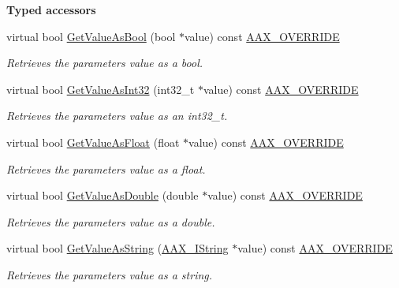 \begin{Indent}{\bf Typed accessors}\par
\begin{DoxyCompactItemize}
\item 
virtual bool \hyperlink{a00033_a70d1b697d4a449b57de917baa0b50e95}{Get\+Value\+As\+Bool} (bool $\ast$value) const \hyperlink{a00149_ac2f24a5172689ae684344abdcce55463}{A\+A\+X\+\_\+\+O\+V\+E\+R\+R\+I\+D\+E}
\begin{DoxyCompactList}\small\item\em Retrieves the parameter\textquotesingle{}s value as a bool. \end{DoxyCompactList}\item 
virtual bool \hyperlink{a00033_af9018dbc8c282fec893a6aa240c3a631}{Get\+Value\+As\+Int32} (int32\+\_\+t $\ast$value) const \hyperlink{a00149_ac2f24a5172689ae684344abdcce55463}{A\+A\+X\+\_\+\+O\+V\+E\+R\+R\+I\+D\+E}
\begin{DoxyCompactList}\small\item\em Retrieves the parameter\textquotesingle{}s value as an int32\+\_\+t. \end{DoxyCompactList}\item 
virtual bool \hyperlink{a00033_a468c96e334e4155490fca7369f7ad323}{Get\+Value\+As\+Float} (float $\ast$value) const \hyperlink{a00149_ac2f24a5172689ae684344abdcce55463}{A\+A\+X\+\_\+\+O\+V\+E\+R\+R\+I\+D\+E}
\begin{DoxyCompactList}\small\item\em Retrieves the parameter\textquotesingle{}s value as a float. \end{DoxyCompactList}\item 
virtual bool \hyperlink{a00033_ae9687028a6c6a5e93223fde4ca9c06ea}{Get\+Value\+As\+Double} (double $\ast$value) const \hyperlink{a00149_ac2f24a5172689ae684344abdcce55463}{A\+A\+X\+\_\+\+O\+V\+E\+R\+R\+I\+D\+E}
\begin{DoxyCompactList}\small\item\em Retrieves the parameter\textquotesingle{}s value as a double. \end{DoxyCompactList}\item 
virtual bool \hyperlink{a00033_a7c5e951eb4c32b2993048acb414adc52}{Get\+Value\+As\+String} (\hyperlink{a00113}{A\+A\+X\+\_\+\+I\+String} $\ast$value) const \hyperlink{a00149_ac2f24a5172689ae684344abdcce55463}{A\+A\+X\+\_\+\+O\+V\+E\+R\+R\+I\+D\+E}
\begin{DoxyCompactList}\small\item\em Retrieves the parameter\textquotesingle{}s value as a string. \end{DoxyCompactList}\item 

\end{DoxyCompactItemize}
\end{Indent}
